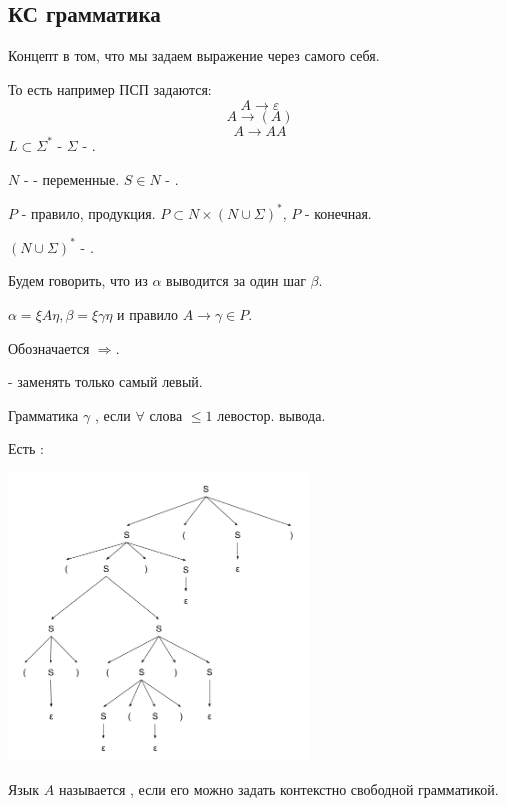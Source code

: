     \subsection{КС грамматика}


Концепт в том, что мы задаем выражение через самого себя.

То есть например ПСП задаются:
$$A \xrightarrow{} \varepsilon$$
$$A \xrightarrow{} (A)$$
$$A \xrightarrow{} AA$$
$L \subset \Sigma^*$ - $\Sigma$ - .

$N$ -  - переменные. $S \in N$ - .

$P$ - правило, продукция. $P \subset N \times (N \cup \Sigma)^*$, $P$ - конечная.


$(N \cup \Sigma)^* $ - .

Будем говорить, что из $\alpha$ выводится за один шаг $\beta$.

$\alpha = \xi A \eta, \beta = \xi\gamma \eta$ и правило $A \xrightarrow{} \gamma \in P$. 

Обозначается $\Rightarrow$. 

 - заменять только самый левый.

Грамматика $\gamma$ , если $\forall$ слова $\leq 1$ левостор. вывода.

Есть :

\begin{center}
   \includegraphics[width=8cm]{assets/11_1_1.png}
\end{center}

Язык $A$ называется , если его можно задать контекстно свободной грамматикой. 

